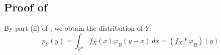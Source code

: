 \documentclass[a4paper,10pt]{article}
\theoremstyle{definition} %
\theoremstyle{definition} %
\theoremstyle{definition} %
\theoremstyle{definition} %
\newcommand{\0}{\boldsymbol{0}}
\begin{document}









\subsection{Proof of }\label{sec:proof_formule_de_Tweedie}
By part (ii) of , we obtain the distribution of $Y$:
\begin{equation*}
p_Y(y) = \int_{\mathbb{R}^n} f_X(x) \varphi_B(y - x) \, dx = (f_X * \varphi_B)(y)
\end{equation*}
\end{document}

